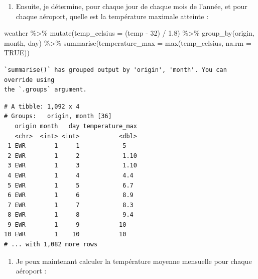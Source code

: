 \documentclass[
  a4paper,
  DIV=11,
  numbers=noendperiod,
  oneside]{scrreprt}
\newenvironment{Shaded}{}{}
\newcommand{\AttributeTok}[1]{\textcolor[rgb]{0.84,0.23,0.29}{#1}}
\newcommand{\ConstantTok}[1]{\textcolor[rgb]{0.00,0.36,0.77}{#1}}
\newcommand{\DecValTok}[1]{\textcolor[rgb]{0.00,0.36,0.77}{#1}}
\newcommand{\FloatTok}[1]{\textcolor[rgb]{0.00,0.36,0.77}{#1}}
\newcommand{\FunctionTok}[1]{\textcolor[rgb]{0.44,0.26,0.76}{#1}}
\newcommand{\NormalTok}[1]{\textcolor[rgb]{0.14,0.16,0.18}{#1}}
\newcommand{\SpecialCharTok}[1]{\textcolor[rgb]{0.00,0.36,0.77}{#1}}
\providecommand{\tightlist}{%
  \setlength{\itemsep}{0pt}\setlength{\parskip}{0pt}}\usepackage{longtable,booktabs,array}
\begin{document}
\begin{enumerate}
\def\labelenumi{\arabic{enumi}.}
\setcounter{enumi}{1}
\tightlist
\item
  Ensuite, je détermine, pour chaque jour de chaque mois de l'année, et
  pour chaque aéroport, quelle est la température maximale atteinte :
\end{enumerate}

\begin{Shaded}
\begin{Highlighting}[]
\NormalTok{weather }\SpecialCharTok{\%\textgreater{}\%} 
  \FunctionTok{mutate}\NormalTok{(}\AttributeTok{temp\_celsius =}\NormalTok{ (temp }\SpecialCharTok{{-}} \DecValTok{32}\NormalTok{) }\SpecialCharTok{/} \FloatTok{1.8}\NormalTok{) }\SpecialCharTok{\%\textgreater{}\%} 
  \FunctionTok{group\_by}\NormalTok{(origin, month, day) }\SpecialCharTok{\%\textgreater{}\%} 
  \FunctionTok{summarise}\NormalTok{(}\AttributeTok{temperature\_max =} \FunctionTok{max}\NormalTok{(temp\_celsius, }\AttributeTok{na.rm =} \ConstantTok{TRUE}\NormalTok{))}
\end{Highlighting}
\end{Shaded}

\begin{verbatim}
`summarise()` has grouped output by 'origin', 'month'. You can override using
the `.groups` argument.
\end{verbatim}

\begin{verbatim}
# A tibble: 1,092 x 4
# Groups:   origin, month [36]
   origin month   day temperature_max
   <chr>  <int> <int>           <dbl>
 1 EWR        1     1            5   
 2 EWR        1     2            1.10
 3 EWR        1     3            1.10
 4 EWR        1     4            4.4 
 5 EWR        1     5            6.7 
 6 EWR        1     6            8.9 
 7 EWR        1     7            8.3 
 8 EWR        1     8            9.4 
 9 EWR        1     9           10   
10 EWR        1    10           10   
# ... with 1,082 more rows
\end{verbatim}

\begin{enumerate}
\def\labelenumi{\arabic{enumi}.}
\setcounter{enumi}{2}
\tightlist
\item
  Je peux maintenant calculer la température moyenne mensuelle pour
  chaque aéroport :
\end{enumerate}
\end{document}
